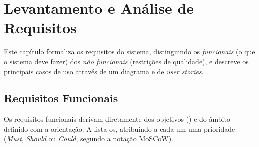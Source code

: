 \chapter{Levantamento e Análise de Requisitos}
\label{cap:requisitos}

Este capítulo formaliza os requisitos do sistema, distinguindo os
\emph{funcionais} (o que o sistema deve fazer) dos \emph{não funcionais}
(restrições de qualidade), e descreve os principais casos de uso através
de um diagrama e de \emph{user stories}.

\section{Requisitos Funcionais}
\label{sec:rf}

Os requisitos funcionais derivam diretamente dos objetivos
() e do âmbito definido com a orientação. A
 lista-os, atribuindo a cada um uma prioridade
(\emph{Must}, \emph{Should} ou \emph{Could}, segundo a notação MoSCoW).

